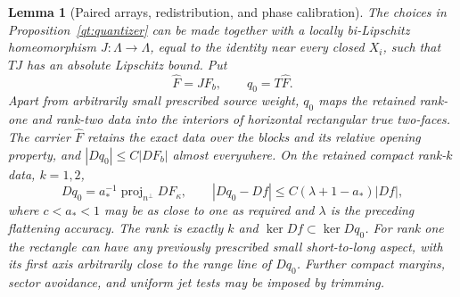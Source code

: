 \documentclass[11pt]{article}
\numberwithin{equation}{section}
\newtheorem{lemma}[theorem]{Lemma}
\theoremstyle{definition}
\theoremstyle{remark}
\begin{document}
\begin{lemma}[Paired arrays, redistribution, and phase calibration]\label{qt:calibration}
The choices in Proposition~\ref{qt:quantizer} can be made together
with a locally bi-Lipschitz homeomorphism
$J:\Lambda\to\Lambda$, equal to the identity near every closed $X_i$,
such that $TJ$ has an absolute Lipschitz bound.  Put
\[
 \widehat F=JF_b,\qquad q_0=T\widehat F.
\]
Apart from arbitrarily small prescribed source weight, $q_0$ maps the
retained rank-one and rank-two data into the interiors of horizontal
rectangular true two-faces.
The carrier $\widehat F$ retains the exact data over the blocks and its
relative opening property, and $|Dq_0|\leq C|DF_b|$ almost everywhere.
On the retained compact rank-$k$ data, $k=1,2$,
\begin{equation}\label{qt:calibrated-gradient}
 Dq_0=a_*^{-1}\operatorname{proj}_{n^\perp}DF_\kappa,
 \qquad |Dq_0-Df|\leq C(\lambda+1-a_*)|Df|,
\end{equation}
where $c<a_*<1$ may be as close to one as required and $\lambda$ is
the preceding flattening accuracy.  The rank is exactly $k$ and
$\ker Df\subset\ker Dq_0$.  For rank one the rectangle can have any
previously prescribed small short-to-long aspect, with its first axis
arbitrarily close to the range line of $Dq_0$.  Further compact margins,
sector avoidance, and uniform jet tests may be imposed by trimming.
\end{lemma}
\end{document}
